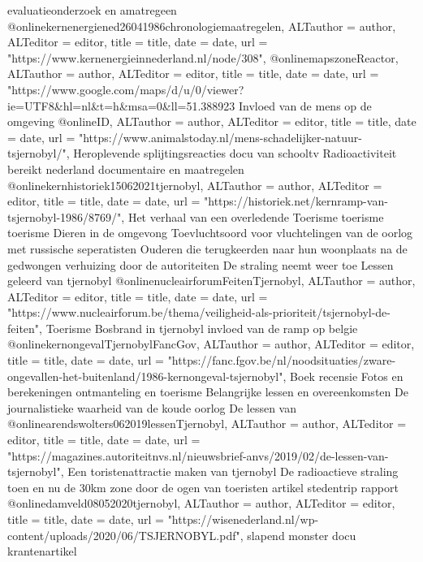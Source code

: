 evaluatieonderzoek en amatregeen
@online{kernenergiened26041986chronologiemaatregelen,	ALTauthor = {author},	ALTeditor = {editor},	title = {title},	date = {date},	url = {"https://www.kernenergieinnederland.nl/node/308"},}
\cite{}
@online{mapszoneReactor,	ALTauthor = {author},	ALTeditor = {editor},	title = {title},	date = {date},	url = {"https://www.google.com/maps/d/u/0/viewer?ie=UTF8&hl=nl&t=h&msa=0&ll=51.388923%
\cite{}
Invloed van de mens op de omgeving
@online{ID,	ALTauthor = {author},	ALTeditor = {editor},	title = {title},	date = {date},	url = {"https://www.animalstoday.nl/mens-schadelijker-natuur-tsjernobyl/"},}
\cite{}
Heroplevende splijtingsreacties
docu van schooltv
Radioactiviteit bereikt nederland
documentaire en maatregelen
@online{kernhistoriek15062021tjernobyl,	ALTauthor = {author},	ALTeditor = {editor},	title = {title},	date = {date},	url = {"https://historiek.net/kernramp-van-tsjernobyl-1986/8769/"},}
\cite{}
Het verhaal van een overledende
Toerisme
toerisme
toerisme
Dieren in de omgevong
Toevluchtsoord voor vluchtelingen van de oorlog met russische seperatisten
Ouderen die terugkeerden naar hun woonplaats na de gedwongen verhuizing door de autoriteiten
De straling neemt weer toe
Lessen geleerd van tjernobyl
@online{nucleairforumFeitenTjernobyl,	ALTauthor = {author},	ALTeditor = {editor},	title = {title},	date = {date},	url = {"https://www.nucleairforum.be/thema/veiligheid-als-prioriteit/tsjernobyl-de-feiten"},}
\cite{}
Toerisme
Bosbrand in tjernobyl
invloed van de ramp op belgie
@online{kernongevalTjernobylFancGov,	ALTauthor = {author},	ALTeditor = {editor},	title = {title},	date = {date},	url = {"https://fanc.fgov.be/nl/noodsituaties/zware-ongevallen-het-buitenland/1986-kernongeval-tsjernobyl"},}
\cite{}
Boek recensie
Fotos en berekeningen
ontmanteling en toerisme
Belangrijke lessen en overeenkomsten
De journalistieke waarheid van de koude oorlog
De lessen van
@online{arendswolters062019lessenTjernobyl,	ALTauthor = {author},	ALTeditor = {editor},	title = {title},	date = {date},	url = {"https://magazines.autoriteitnvs.nl/nieuwsbrief-anvs/2019/02/de-lessen-van-tsjernobyl"},}
\cite{}
Een toristenattractie maken van tjernobyl
De radioactieve straling toen en nu
de 30km zone door de ogen van toeristen
artikel
stedentrip
rapport
@online{damveld08052020tjernobyl,	ALTauthor = {author},	ALTeditor = {editor},	title = {title},	date = {date},	url = {"https://wisenederland.nl/wp-content/uploads/2020/06/TSJERNOBYL.pdf"},}
\cite{}
slapend monster
docu
krantenartikel
}}
